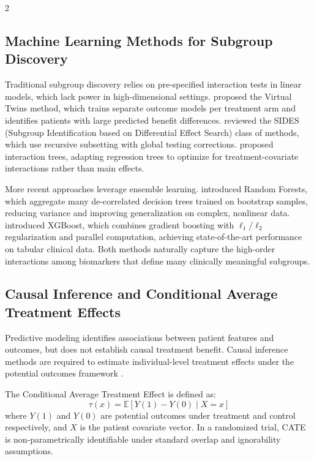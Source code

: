 \documentclass[12pt]{article}
\begin{document}
\begin{multicols}{2}
\subsection{Machine Learning Methods for Subgroup Discovery}

Traditional subgroup discovery relies on pre-specified interaction tests in
linear models, which lack power in high-dimensional settings.
\citet{foster2011subgroup} proposed the Virtual Twins method, which trains
separate outcome models per treatment arm and identifies patients with large
predicted benefit differences.  \citet{lipkovich2017tutorial} reviewed the
SIDES (Subgroup Identification based on Differential Effect Search) class of
methods, which use recursive subsetting with global testing corrections.
\citet{su2009subgroup} proposed interaction trees, adapting regression trees
to optimize for treatment-covariate interactions rather than main effects.

More recent approaches leverage ensemble learning.  \citet{breiman2001random}
introduced Random Forests, which aggregate many de-correlated decision trees
trained on bootstrap samples, reducing variance and improving generalization
on complex, nonlinear data.  \citet{chen2016xgboost} introduced XGBoost,
which combines gradient boosting with $\ell_1$/$\ell_2$ regularization and
parallel computation, achieving state-of-the-art performance on tabular
clinical data.  Both methods naturally capture the high-order interactions
among biomarkers that define many clinically meaningful subgroups.

\subsection{Causal Inference and Conditional Average Treatment Effects}

Predictive modeling identifies associations between patient features and
outcomes, but does not establish causal treatment benefit.  Causal inference
methods are required to estimate individual-level treatment effects under the
potential outcomes framework \citep{rubin1974}.

The Conditional Average Treatment Effect is defined as:
\begin{equation}
\tau(x) = \mathbb{E}[Y(1) - Y(0) \mid X = x]
\end{equation}
where $Y(1)$ and $Y(0)$ are potential outcomes under treatment and control
respectively, and $X$ is the patient covariate vector.  In a randomized
trial, CATE is non-parametrically identifiable under standard overlap and
ignorability assumptions.


\end{multicols}
\end{document}
